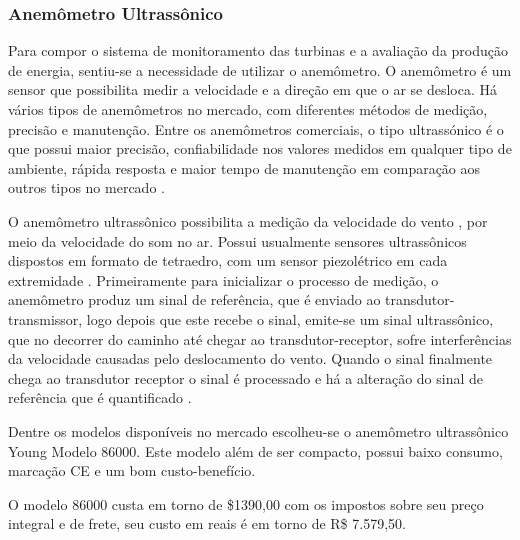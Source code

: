 \subsubsection{Anemômetro Ultrassônico}
  
  Para compor o sistema de monitoramento das turbinas e a avaliação da produção de energia, sentiu-se a necessidade de utilizar
  o anemômetro. O anemômetro é um sensor que possibilita medir a velocidade e a direção em que o ar se desloca. Há vários tipos
  de anemômetros no mercado, com diferentes métodos de medição, precisão e manutenção. Entre os anemômetros comerciais, o tipo
  ultrassónico é o que possui maior precisão, confiabilidade nos valores medidos em qualquer tipo de ambiente, rápida resposta
  e maior tempo de manutenção em comparação aos outros tipos no mercado \cite{pereira07}.
  
  O anemômetro ultrassônico possibilita a medição da velocidade do vento , por meio da velocidade do som no ar. Possui usualmente
  sensores ultrassônicos dispostos em formato de tetraedro, com um sensor piezolétrico em cada extremidade \cite{ribeiro06}.
  Primeiramente para inicializar o processo de medição, o anemômetro produz um sinal de referência, que é enviado ao 
  transdutor-transmissor, logo depois que este recebe o sinal, emite-se um sinal ultrassônico, que no decorrer do caminho até 
  chegar ao transdutor-receptor, sofre interferências da velocidade causadas pelo deslocamento do vento. Quando o sinal finalmente
  chega ao transdutor receptor o sinal é processado e há a alteração do sinal de referência que é quantificado \cite{pereira07}.
  
  Dentre os modelos disponíveis no mercado escolheu-se o anemômetro ultrassônico Young Modelo 86000.
  Este modelo além de ser compacto, possui baixo consumo, marcação CE e um bom custo-benefício.
  
  O modelo 86000 custa em torno de \$1390,00 com os impostos sobre seu preço integral e de frete, seu custo em reais
  é em torno de R\$ 7.579,50.
  
